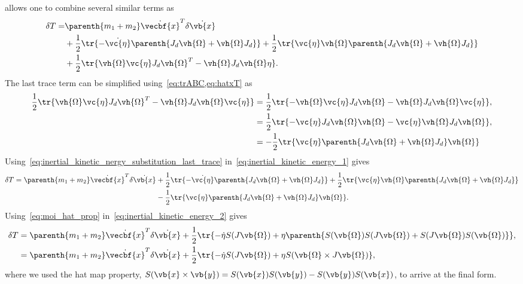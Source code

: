  allows one to combine several similar terms as
\begin{align}\label{eq:inertial_kinetic_energy_1}
    \delta T =&\parenth{m_1 + m_2} \dot{\vecbf{x}}^T \delta \dot{\vb{x}} \nonumber\\
              &+ \frac{1}{2} \tr{-\dot{\vc{\eta}} \parenth{J_d \vh{\Omega} + \vh{\Omega} J_d}} + \frac{1}{2} \tr{\vc{\eta} \vh{\Omega} \parenth{J_d \vh{\Omega} + \vh{\Omega} J_d}} \nonumber \\
              &+ \frac{1}{2} \tr{ \vh{\Omega} \vc{\eta} J_d \vh{\Omega}^T - \vh{\Omega} J_d \vh{\Omega} \eta}.
\end{align}
The last trace term can be simplified using~\cref{eq:trABC,eq:hatxT} as
\begin{align}\label{eq:inertial_kinetic_nergy_substitution_last_trace}
    \frac{1}{2} \tr{ \vh{\Omega} \vc{\eta} J_d \vh{\Omega}^T - \vh{\Omega} J_d \vh{\Omega} \vc{\eta}} &= \frac{1}{2} \tr{ - \vh{\Omega} \vc{\eta} J_d \vh{\Omega} - \vh{\Omega} J_d \vh{\Omega} \vc{\eta}},\nonumber \\
                                                                                                      &= \frac{1}{2} \tr{ - \vc{\eta} J_d \vh{\Omega} \vh{\Omega} - \vc{\eta} \vh{\Omega} J_d \vh{\Omega} }, \nonumber\\
                                                                                                      &= -\frac{1}{2} \tr{\vc{\eta} \parenth{J_d \vh{\Omega} + \vh{\Omega} J_d }\vh{\Omega}}
\end{align}
Using~\cref{eq:inertial_kinetic_nergy_substitution_last_trace} in~\cref{eq:inertial_kinetic_energy_1} gives
\begin{align}\label{eq:inertial_kinetic_energy_2}
    \delta T =\parenth{m_1 + m_2} \dot{\vecbf{x}}^T \delta \dot{\vb{x}} &+ \frac{1}{2} \tr{-\dot{\vc{\eta}} \parenth{J_d \vh{\Omega} + \vh{\Omega} J_d}} + \frac{1}{2} \tr{\vc{\eta} \vh{\Omega} \parenth{J_d \vh{\Omega} + \vh{\Omega} J_d}} \nonumber \\
              &- \frac{1}{2} \tr{ \vc{\eta} \parenth{J_d \vh{\Omega} + \vh{\Omega} J_d }\vh{\Omega}} .
\end{align}
Using~\cref{eq:moi_hat_prop} in~\cref{eq:inertial_kinetic_energy_2} gives
\begin{align}\label{eq:kinetic_energy_variation_final}
    \delta T &= \parenth{m_1 + m_2} \dot{\vecbf{x}}^T \delta \dot{\vb{x}} + \frac{1}{2} \tr{-\dot \eta S(J \vb{\Omega}) + \eta \parenth{ S(\vb{\Omega}) S(J \vb{\Omega}) + S(J \vb{\Omega}) S(\vb{\Omega})} } , \nonumber\\
    &=  \parenth{m_1 + m_2} \dot{\vecbf{x}}^T \delta \dot{\vb{x}} + \frac{1}{2} \tr{ - \dot{\eta} S(J \vb{\Omega}) + \eta S(\vb{\Omega} \times J \vb{\Omega})} , 
\end{align}
where we used the hat map property, \( S(\vb{x} \times \vb{y}) = S(\vb{x})S(\vb{y}) - S(\vb{y})S(\vb{x}) \), to arrive at the final form.


